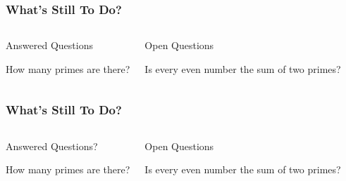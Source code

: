 \begin{frame}
  \frametitle{What's Still To Do?}


  \begin{columns}[t]


    \begin{block}{Answered Questions}

      How many primes are there?

    \end{block}




    \begin{block}{Open Questions}

      Is every even number the sum of two primes?

    \end{block}

  \end{columns}

\end{frame}





\begin{frame}
  \frametitle{What's Still To Do?}


  \begin{columns}[t]


    \begin{block}{Answered Questions?}

      How many primes are there?

    \end{block}

    \pause






    \begin{block}{Open Questions}

      Is every even number the sum of two primes?

    \end{block}

  \end{columns}

\end{frame}





